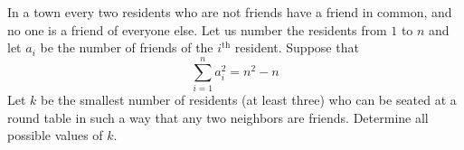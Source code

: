 In a town every two residents who are not friends have a friend in common, and no one is a friend of everyone else. Let us number the residents from  $1$ to $n$ and let $a_i$ be the number of friends of the $i^{\text{th}}$ resident. Suppose that
\[ \sum_{i=1}^{n}a_i^2=n^2-n \]
Let $k$ be the smallest number of residents (at least three) who can be seated at a round table in such a way that any two neighbors are friends. Determine all possible values of $k.$